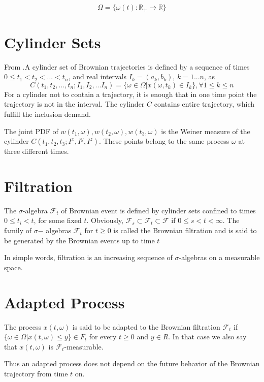 \documentclass[12pt]{book}
\begin{document}
\begin{equation*}
\Omega=\{\omega(t):\mathbb{R}_+\rightarrow\mathbb{R}\}
\end{equation*}

\section{Cylinder Sets}\label{section:cylinderSets}
From \cite{schuss2009theory}.A cylinder set of Brownian trajectories is defined by a sequence of times $0\leq t_1<t_2<...<t_n$, and real intervals $I_k=(a_k,b_k)$, $k=1...n$, as 
\begin{equation*}
C(t_1,t_2,...,t_n;I_1,I_2,...I_n)=\{\omega\in \Omega|x(\omega,t_k)\in I_k\},\forall 1\leq k \leq n
\end{equation*}
For a cylinder not to contain a trajectory, it is enough that in one time point the trajectory is not in the interval.
The cylinder $C$ contains entire trajectory, which fulfill the inclusion demand. 

The joint PDF of $w(t_1,\omega),w(t_2,\omega),w(t_3,\omega)$ is the Weiner measure of the cylinder $C(t_1,t_2,t_3;I^x,I^y,I^z)$. These points belong to the same process $\omega$ at three different times. 

\section{Filtration}\label{section:filtration}
The $\sigma$-algebra $\mathcal{F}_t$ of Brownian event is defined by cylinder
sets confined to times $0\leq t_i < t$, for some fixed $t$. Obviously, $\mathcal{F}_s \subset \mathcal{F}_t \subset \mathcal{F}$ if $0\leq s < t <\infty$. The family of $\sigma$− algebras $\mathcal{F}_t$ for $t \geq 0$ is called the Brownian filtration and is said to be generated by the Brownian events up to time $t$

In simple words, filtration is an increasing sequence of $\sigma$-algebras on a measurable space. 

\section{Adapted Process}\label{section:adaptedProcess}
The process $x(t,\omega)$ is said to be adapted
to the Brownian filtration $\mathcal{F}_t$ if $\{\omega\in\Omega|x(t,\omega) \leq y\} \in F_t$ for every $t \geq 0$ and
$y\in R$. In that case we also say that $x(t, \omega)$ is $\mathcal{F}_t$-measurable.

Thus an adapted process does not depend on the future behavior of the Brownian trajectory from time $t$ on.
\end{document}
